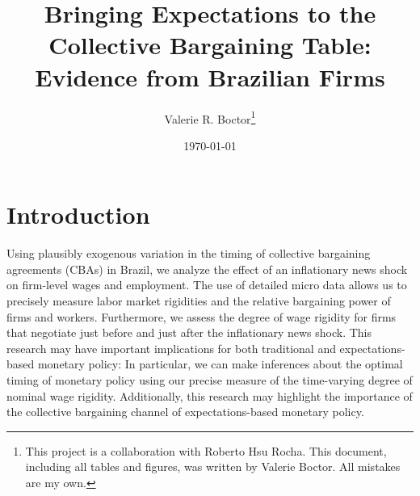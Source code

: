 \documentclass[12pt]{article}
\begin{document}
	\title{Bringing Expectations to the Collective Bargaining Table: Evidence from Brazilian Firms}
	\author{Valerie R. Boctor\thanks{This project is a collaboration with Roberto Hsu Rocha. This document, including all tables and figures, was written by Valerie Boctor. All mistakes are my own. }}
	\date{\today}
	\maketitle

	\section{Introduction}
		Using plausibly exogenous variation in the timing of collective bargaining agreements (CBAs) in Brazil, we analyze the effect of an inflationary news shock on firm-level wages and employment. The use of detailed micro data allows us to precisely measure labor market rigidities and the relative bargaining power of firms and workers. Furthermore, we assess the degree of wage rigidity for firms that negotiate just before and just after the inflationary news shock. This research may have important implications for both traditional and expectations-based monetary policy: In particular, we can make inferences about the optimal timing of monetary policy using our precise measure of the time-varying degree of nominal wage rigidity. Additionally, this research may highlight the importance of the collective bargaining channel of expectations-based monetary policy.
	
\end{document}
